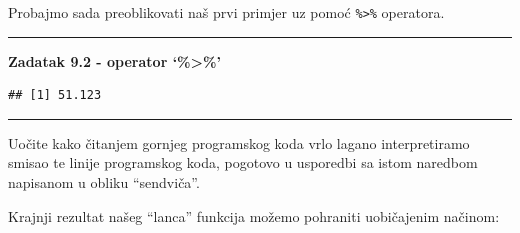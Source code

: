 \documentclass[]{book}
\newenvironment{Shaded}{\begin{snugshade}}{\end{snugshade}}
\newcommand{\KeywordTok}[1]{\textcolor[rgb]{0.13,0.29,0.53}{\textbf{#1}}}
\newcommand{\DecValTok}[1]{\textcolor[rgb]{0.00,0.00,0.81}{#1}}
\newcommand{\StringTok}[1]{\textcolor[rgb]{0.31,0.60,0.02}{#1}}
\newcommand{\CommentTok}[1]{\textcolor[rgb]{0.56,0.35,0.01}{\textit{#1}}}
\newcommand{\OperatorTok}[1]{\textcolor[rgb]{0.81,0.36,0.00}{\textbf{#1}}}
\newcommand{\NormalTok}[1]{#1}
\theoremstyle{definition}
\theoremstyle{definition}
\theoremstyle{definition}
\theoremstyle{remark}
\begin{document}
Probajmo sada preoblikovati naš prvi primjer uz pomoć
\texttt{\%\textgreater{}\%} operatora.

\begin{center}\rule{0.5\linewidth}{\linethickness}\end{center}

\textbf{Zadatak 9.2 - operator `\%\textgreater{}\%'}

\begin{Shaded}
\end{Shaded}

\begin{Shaded}
\end{Shaded}

\begin{verbatim}
## [1] 51.123
\end{verbatim}

\begin{center}\rule{0.5\linewidth}{\linethickness}\end{center}

Uočite kako čitanjem gornjeg programskog koda vrlo lagano interpretiramo
smisao te linije programskog koda, pogotovo u usporedbi sa istom
naredbom napisanom u obliku ``sendviča''.

Krajnji rezultat našeg ``lanca'' funkcija možemo pohraniti uobičajenim
načinom:

\begin{Shaded}
\end{Shaded}
\end{document}
